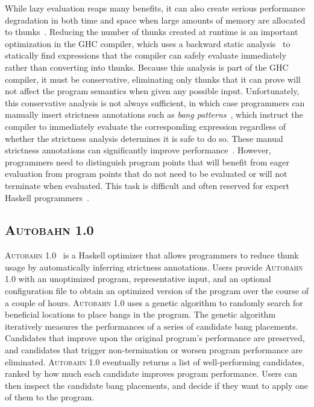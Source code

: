 \documentclass[format=sigplan, review=true]{acmart}
\newcommand{\Ao}[0]{\textsc{Autobahn 1.0}}
\begin{document}
While lazy evaluation reaps many benefits, it can also create serious
performance degradation in both time and space when large amounts of
memory are allocated to thunks~\cite{Jones94,Santos98,Ennals03}.
Reducing the number of thunks created at runtime is an important
optimization in the GHC compiler, which uses a backward static
analysis~\cite{Sergey14} to statically find expressions that the
compiler can safely evaluate immediately rather than converting into
thunks.  Because this analysis is part of the GHC compiler, it must be
conservative, eliminating only thunks that it can prove will not
affect the program semantics when given any possible input.
Unfortunately, this conservative analysis is not always sufficient, in
which case programmers can manually insert strictness annotations such
as \textit{bang patterns}~\cite{bang}, which instruct the compiler to
immediately evaluate the corresponding expression regardless of
whether the strictness analysis determines it is safe to do so.  These
manual strictness annotations can significantly improve
performance~\cite[Chapter~25]{rwh}. However, programmers need to
distinguish program points that will benefit from eager evaluation
from program points that do not need to be evaluated or will not
terminate when evaluated. This task is difficult and often reserved
for expert Haskell programmers~\cite{Mitchell13}.

\subsection{\Ao}

\Ao~\cite{autobahn-wang} is a Haskell optimizer that allows programmers to
reduce thunk usage by automatically inferring strictness
annotations. Users provide \Ao{} with an unoptimized
program, representative input, and an optional configuration file to
obtain an optimized version of the program over the course of a couple
of hours.
\Ao{} uses a genetic algorithm to randomly search for
beneficial locations to place bangs in the program. The genetic
algorithm iteratively measures the performances of a series of
candidate bang placements. Candidates that improve upon the original
program's performance are preserved, and candidates that trigger
non-termination or worsen program performance are
eliminated. \Ao{} eventually returns a list
of well-performing candidates, ranked by how much each candidate
improves program performance. Users can then inspect the candidate
bang placements, and decide if they want to apply one of them to the
program.
\end{document}
